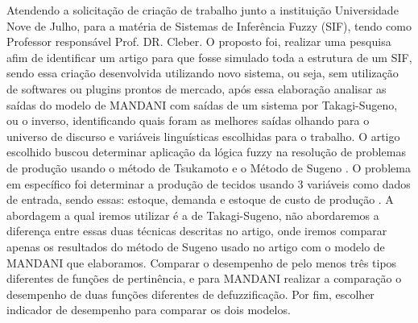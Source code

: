 \documentclass[courier]{uninove-ppgi}
\begin{document}
    
        
    
    
    
        \capa
        
        
        
        \folharosto
    
    		   
    
    
    \begin{resumo}
    
        Atendendo a solicitação de criação de trabalho junto a instituição Universidade Nove de Julho, para a matéria de Sistemas de Inferência Fuzzy (SIF),
        tendo como Professor responsável Prof. DR. Cleber. O proposto foi, realizar uma pesquisa afim de identificar um artigo para que fosse simulado toda a estrutura de um SIF, 
        sendo essa criação desenvolvida utilizando novo sistema, ou seja, sem utilização de softwares ou plugins prontos de mercado, após essa elaboração analisar
        as saídas do modelo de MANDANI com saídas de um sistema por Takagi-Sugeno, ou o inverso, identificando quais foram as melhores saídas olhando para o universo de 
        discurso e variáveis linguísticas escolhidas para o trabalho. O artigo escolhido buscou determinar aplicação da lógica fuzzy na resolução de problemas de produção usando o método de Tsukamoto e o Método de Sugeno .
		O problema em específico foi determinar a produção de tecidos usando 3 variáveis como dados de entrada, sendo essas: estoque, demanda e estoque de custo de produção .
		A abordagem a qual iremos utilizar é a de Takagi-Sugeno, não abordaremos a diferença entre essas duas técnicas descritas no artigo, onde iremos comparar apenas os resultados do método de Sugeno usado no artigo
		com o modelo de MANDANI que elaboramos. Comparar o desempenho de pelo menos três tipos diferentes de funções de pertinência, e para MANDANI realizar a comparação o desempenho de duas
		funções diferentes de defuzzificação. Por fim, escolher indicador de desempenho para comparar os dois modelos.
    
    \end{resumo}
    
\end{document}
